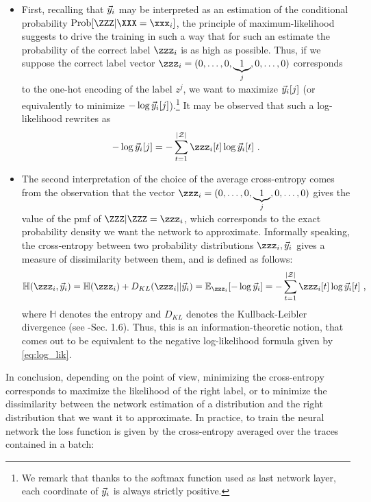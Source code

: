 \begin{itemize}
\item First, recalling that $\vec{y}_i$ may be interpreted as an estimation of the conditional probability $\prob[\ZZZ | \XXX = \xxx_i]$, the principle of maximum-likelihood suggests to drive the training in such a way that for such an estimate the probability of the correct label $\zzz_i$ is as high as possible. Thus, if we suppose the correct label vector $\zzz_i=(0,\ldots , 0,\underbrace{1}_{j},0,\dots,0)$ corresponds to the one-hot encoding of the label $z^j$, we want to maximize $\vec{y}_i[j]$ (or equivalently to minimize $-\log{\vec{y}_i[j]}$).\footnote{We remark that thanks to the softmax function used as last network layer, each coordinate of $\vec{y}_i$ is always strictly positive.} It may be observed that such a log-likelihood rewrites as 
\begin{equation}\label{eq:log_lik}
-\log{\yyy_i[j]} = -\sum_{t=1}^{|\sensVarSet|}\zzz_i[t]\log{\yyy_i[t]} \mbox{ .}
\end{equation}
\item The second interpretation of the choice of the average cross-entropy comes from the observation that the vector $\zzz_i = (0,\ldots , 0,\underbrace{1}_{j},0,\dots,0)$ gives the value of the pmf of $\ZZZ| \ZZZ = \zzz_i$, which corresponds to the exact probability density we want the network to approximate. Informally speaking, the cross-entropy between two probability distributions $\zzz_i, \yyy_i$ gives a measure of dissimilarity between them, and is defined as follows:
\begin{equation}
\mathbb{H}(\zzz_i, \yyy_i) = \mathbb{H}(\zzz_i) + D_{KL}(\zzz_i || \yyy_i) = \esper_{\zzz_i}[-\log{\yyy_i}] = -\sum_{t=1}^{|\sensVarSet|}\zzz_i[t]\log{\yyy_i[t]} \mbox{ ,}
\end{equation}
where $\mathbb{H}$ denotes the entropy and $D_{KL}$ denotes the Kullback-Leibler divergence (see \cite{christopher2006pattern}-Sec. 1.6). Thus, this is an information-theoretic notion, that comes out to be equivalent to the negative log-likelihood formula given by \eqref{eq:log_lik}. 
\end{itemize}
In conclusion, depending on the point of view, minimizing the cross-entropy corresponds to maximize the likelihood of the right label, or to minimize the dissimilarity between the network estimation of a distribution and the right distribution that we want it to approximate.
In practice, to train the neural network the loss function is given by the cross-entropy averaged over the traces contained in a batch:
